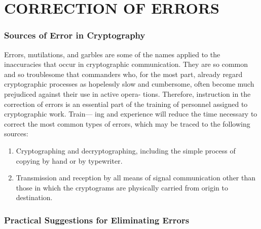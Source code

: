 \chapter{CORRECTION OF ERRORS}
\subsection{Sources of Error in Cryptography}

Errors, mutilations, and garbles are some of the names applied to the
inaccuracies that occur in cryptographic communication. They are so
common and so troublesome that commanders who, for the most part,
already regard cryptographic processes as hopelessly slow and cumbersome, often become much prejudiced against their use in active opera-
tions. Therefore, instruction in the correction of errors is an essential
part of the training of personnel assigned to cryptographic work. Train—
ing and experience will reduce the time necessary to correct the most
common types of errors, which may be traced to the following sources:
\begin{enumerate}[label=\alph*]
\item Cryptographing and decryptographing, including the simple process
of copying by hand or by typewriter.

\item Transmission and reception by all means of signal communication
other than those in which the cryptograms are physically carried from
origin to destination.
\end{enumerate}

\subsection{Practical Suggestions for Eliminating Errors}

